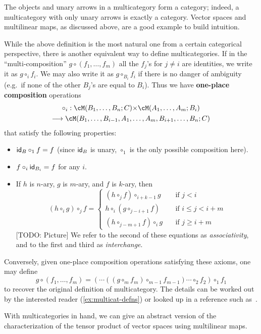 The objects and unary arrows in a multicategory form a category; indeed, a multicategory with only unary arrows is exactly a category.
Vector spaces and multilinear maps, as discussed above, are a good example to build intuition.

While the above definition is the most natural one from a certain categorical perspective, there is another equivalent way to define multicategories.
If in the ``multi-composition'' $g\circ (f_1,\dots,f_m)$ all the $f_j$'s for $j\neq i$ are identities, we write it as $g \circ_i f_i$.
We may also write it as $g\circ_{B_i} f_i$ if there is no danger of ambiguity (e.g.\ if none of the other $B_j$'s are equal to $B_i$).
Thus we have \textbf{one-place composition} operations
\begin{multline*}
  \circ_i : \cM(B_1,\dots,B_n;C) \times \cM(A_1,\dots,A_m;B_i) \\
  \too \cM(B_1,\dots,B_{i-1},A_1,\dots,A_m,B_{i+1},\dots,B_n;C)
\end{multline*}
that satisfy the following properties:
\begin{itemize}
\item $\mathsf{id}_B \circ_1 f = f$ (since $\mathsf{id}_B$ is unary, $\circ_1$ is the only possible composition here).
\item $f\circ_i \mathsf{id}_{B_i} = f$ for any $i$.
\item If $h$ is $n$-ary, $g$ is $m$-ary, and $f$ is $k$-ary, then
  \[ (h \circ_i g) \circ_{j} f=
  \begin{cases}
    (h\circ_j f)\circ_{i+k-1} g &\quad \text{if } j < i\\
    h\circ_i (g\circ_{j-i+1} f) &\quad \text{if } i \le j < i+m\\
    (h\circ_{j-m+1} f)\circ_{i} g &\quad \text{if } j \ge i+m
  \end{cases}
  \]
  [TODO: Picture]
  We refer to the second of these equations as \emph{associativity}, and to the first and third as \emph{interchange}.
\end{itemize}
Conversely, given one-place composition operations satisfying these axioms, one may define
\[ g\circ (f_1,\dots,f_m) = (\cdots((g \circ_m f_m) \circ_{m-1} f_{m-1}) \cdots \circ_2 f_2) \circ_1 f_1 \]
to recover the original definition of multicategory.
The details can be worked out by the interested reader (\cref{ex:multicat-defns}) or looked up in a reference such as~\cite{leinster:higher-opds}.

With multicategories in hand, we can give an abstract version of the characterization of the tensor product of vector spaces using multilinear maps.


